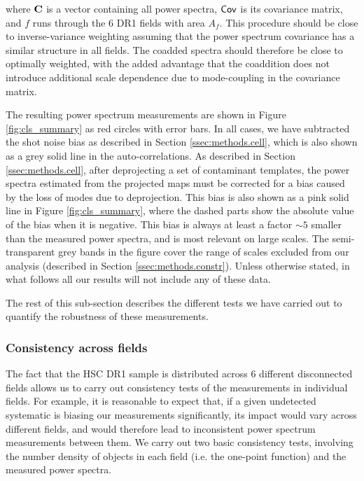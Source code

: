 \documentclass[a4paper,11pt]{article}
\begin{document}
      where ${\bf C}$ is a vector containing all power spectra, ${\sf Cov}$ is its covariance matrix, and $f$ runs through the 6 DR1 fields with area $A_f$. This procedure should be close to inverse-variance weighting assuming that the power spectrum covariance has a similar structure in all fields. The coadded spectra should therefore be close to optimally weighted, with the added advantage that the coaddition does not introduce additional scale dependence due to mode-coupling in the covariance matrix.
      
      The resulting power spectrum measurements are shown in Figure \ref{fig:cls_summary} as red circles with error bars. In all cases, we have subtracted the shot noise bias as described in Section \ref{ssec:methods.cell}, which is also shown as a grey solid line in the auto-correlations. As described in Section \ref{ssec:methods.cell}, after deprojecting a set of contaminant templates, the power spectra estimated from the projected maps must be corrected for a bias caused by the loss of modes due to deprojection. This bias is also shown as a pink solid line in Figure \ref{fig:cls_summary}, where the dashed parts show the absolute value of the bias when it is negative. This bias is always at least a factor $\sim5$ smaller than the measured power spectra, and is most relevant on large scales. The semi-transparent grey bands in the figure cover the range of scales excluded from our analysis (described in Section \ref{ssec:methods.constr}). Unless otherwise stated, in what follows all our results will not include any of these data.
      
      The rest of this sub-section describes the different tests we have carried out to quantify the robustness of these measurements.

    \subsubsection{Consistency across fields}\label{sssec:results.spectra.consistent}
      The fact that the HSC DR1 sample is distributed across 6 different disconnected fields allows us to carry out consistency tests of the measurements in individual fields. For example, it is reasonable to expect that, if a given undetected systematic is biasing our measurements significantly, its impact would vary across different fields, and would therefore lead to inconsistent power spectrum measurements between them. We carry out two basic consistency tests, involving the number density of objects in each field (i.e. the one-point function) and the measured power spectra.
      
\end{document}
